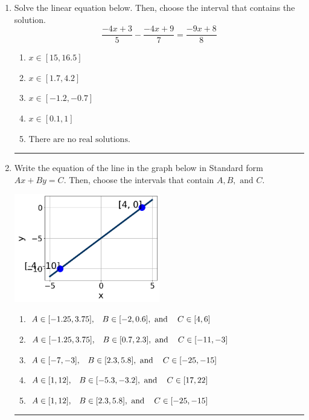 \documentclass[14pt]{extbook}
\newcommand{\litem}[1]{\item#1\hspace*{-1cm}\rule{\textwidth}{0.4pt}}
\begin{document}
\begin{enumerate}
{\begin{enumerate}[label=\Alph*.]
\end{enumerate} }
\litem{
Solve the linear equation below. Then, choose the interval that contains the solution.\[ \frac{-4x + 3}{5} - \frac{-4x + 9}{7} = \frac{-9x + 8}{8} \]\begin{enumerate}[label=\Alph*.]
\item \( x \in [15, 16.5] \)
\item \( x \in [1.7, 4.2] \)
\item \( x \in [-1.2, -0.7] \)
\item \( x \in [0.1, 1] \)
\item \( \text{There are no real solutions.} \)

\end{enumerate} }
\litem{
Write the equation of the line in the graph below in Standard form $Ax+By=C$. Then, choose the intervals that contain $A, B, \text{ and } C$.
\begin{center}
    \includegraphics[width=0.5\textwidth]{../Figures/linearGraphToStandardCopyC.png}
\end{center}
\begin{enumerate}[label=\Alph*.]
\item \( A \in [-1.25, 3.75], \hspace{3mm} B \in [-2, 0.6], \text{ and } \hspace{3mm} C \in [4, 6] \)
\item \( A \in [-1.25, 3.75], \hspace{3mm} B \in [0.7, 2.3], \text{ and } \hspace{3mm} C \in [-11, -3] \)
\item \( A \in [-7, -3], \hspace{3mm} B \in [2.3, 5.8], \text{ and } \hspace{3mm} C \in [-25, -15] \)
\item \( A \in [1, 12], \hspace{3mm} B \in [-5.3, -3.2], \text{ and } \hspace{3mm} C \in [17, 22] \)
\item \( A \in [1, 12], \hspace{3mm} B \in [2.3, 5.8], \text{ and } \hspace{3mm} C \in [-25, -15] \)


\end{enumerate}}
\end{enumerate}
\end{document}
